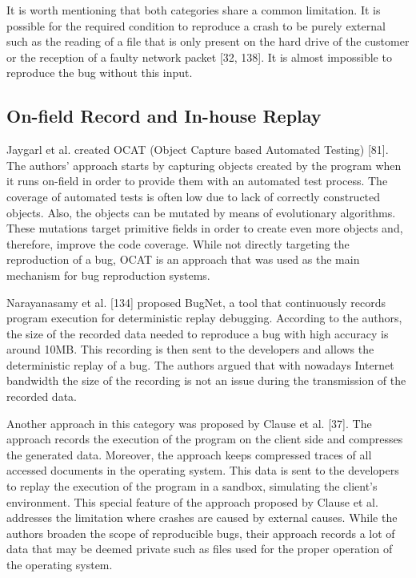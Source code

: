 \documentclass[12pt]{report}
\begin{document}
It is worth mentioning that both categories share a common limitation.
It is possible for the required condition to reproduce a crash to be
purely external such as the reading of a file that is only present on
the hard drive of the customer or the reception of a faulty network
packet {[}32, 138{]}. It is almost impossible to reproduce the bug
without this input.

\subsection{On-field Record and In-house
Replay}\label{on-field-record-and-in-house-replay}

Jaygarl et al. created OCAT (Object Capture based Automated Testing)
{[}81{]}. The authors' approach starts by capturing objects created by
the program when it runs on-field in order to provide them with an
automated test process. The coverage of automated tests is often low due
to lack of correctly constructed objects. Also, the objects can be
mutated by means of evolutionary algorithms. These mutations target
primitive fields in order to create even more objects and, therefore,
improve the code coverage. While not directly targeting the reproduction
of a bug, OCAT is an approach that was used as the main mechanism for
bug reproduction systems.

Narayanasamy et al. {[}134{]} proposed BugNet, a tool that continuously
records program execution for deterministic replay debugging. According
to the authors, the size of the recorded data needed to reproduce a bug
with high accuracy is around 10MB. This recording is then sent to the
developers and allows the deterministic replay of a bug. The authors
argued that with nowadays Internet bandwidth the size of the recording
is not an issue during the transmission of the recorded data.

Another approach in this category was proposed by Clause et al.
{[}37{]}. The approach records the execution of the program on the
client side and compresses the generated data. Moreover, the approach
keeps compressed traces of all accessed documents in the operating
system. This data is sent to the developers to replay the execution of
the program in a sandbox, simulating the client's environment. This
special feature of the approach proposed by Clause et al. addresses the
limitation where crashes are caused by external causes. While the
authors broaden the scope of reproducible bugs, their approach records a
lot of data that may be deemed private such as files used for the proper
operation of the operating system.
\end{document}
